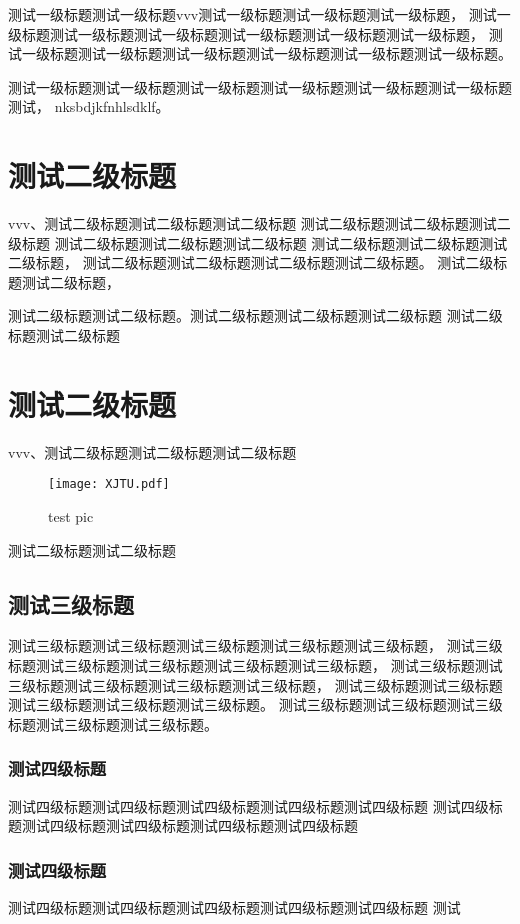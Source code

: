     测试一级标题测试一级标题vvv测试一级标题测试一级标题测试一级标题，
    测试一级标题测试一级标题测试一级标题测试一级标题测试一级标题测试一级标题，
    测试一级标题测试一级标题测试一级标题测试一级标题测试一级标题测试一级标题。

    测试一级标题测试一级标题测试一级标题测试一级标题测试一级标题测试一级标题测试，
    nksbdjkfnhlsdklf。
    \section{测试二级标题}
        vvv、测试二级标题测试二级标题测试二级标题
        测试二级标题测试二级标题测试二级标题
        测试二级标题测试二级标题测试二级标题
        测试二级标题测试二级标题测试二级标题，
        测试二级标题测试二级标题测试二级标题测试二级标题。
        测试二级标题测试二级标题，

        测试二级标题测试二级标题。测试二级标题测试二级标题测试二级标题
        测试二级标题测试二级标题
    \section{测试二级标题}
        vvv、测试二级标题测试二级标题测试二级标题

        \begin{figure}[h!]
            \texttt{[image: XJTU.pdf]}
            \caption{\normalsize test pic}
        \end{figure}

        测试二级标题测试二级标题
        \subsection{测试三级标题}
            测试三级标题测试三级标题测试三级标题测试三级标题测试三级标题，
            测试三级标题测试三级标题测试三级标题测试三级标题测试三级标题，
            测试三级标题测试三级标题测试三级标题测试三级标题测试三级标题，
            测试三级标题测试三级标题测试三级标题测试三级标题测试三级标题。
            测试三级标题测试三级标题测试三级标题测试三级标题测试三级标题。
                \subsubsection{测试四级标题}
                    测试四级标题测试四级标题测试四级标题测试四级标题测试四级标题
                    测试四级标题测试四级标题测试四级标题测试四级标题测试四级标题
                \subsubsection{测试四级标题}
                    测试四级标题测试四级标题测试四级标题测试四级标题测试四级标题
                    测试
